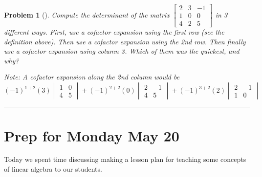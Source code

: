 \documentclass[letterpaper,oneside]{book}%
\theoremstyle{plain}
\theoremstyle{box}
\theoremstyle{problem}
\newtheorem{problemnum}{Problem}[chapter]
\newenvironment{problem}[1][]{\begin{problemnum}[#1]}{\end{problemnum}\nopagebreak\hrule\bigskip}
\begin{document}
\begin{problem}
 Compute the determinant of the matrix
$
\begin{bmatrix}
 2 & 3 & -1 \\
 1 & 0 & 0 \\
 4 & 2 & 5
\end{bmatrix}
$
in 3 different ways. First, use a cofactor expansion using the first row (see the definition  above).  Then use a cofactor expansion using the 2nd row.  Then finally use a cofactor expansion using column 3.  Which of them was the quickest, and why?

Note:  A cofactor expansion along the 2nd column would be 
$$(-1)^{1+2}(3)\begin{vmatrix}1&0\\4&5\end{vmatrix}+(-1)^{2+2}(0)\begin{vmatrix}2&-1\\4&5\end{vmatrix}+(-1)^{3+2}(2)\begin{vmatrix}2&-1\\1&0\end{vmatrix}$$
\end{problem}





\section{Prep for Monday May 20}
Today we spent time discussing making a lesson plan for teaching some concepts of linear algebra to our students. 
\end{document}
